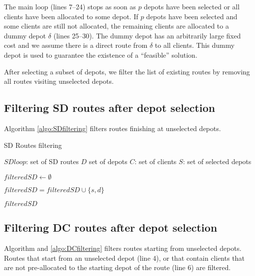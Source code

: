 \documentclass[10pt, a4paper]{article}
\begin{document}
The main loop (lines 7--24) stops as soon as $p$ depots have been selected or all clients have been allocated to some depot. If $p$ depots have been selected and some clients are still not allocated, the remaining clients are allocated to a dummy depot $\delta$ (lines 25--30). The dummy depot has an arbitrarily large fixed cost and we assume there is a direct route from $\delta$ to all clients. This dummy depot is used to guarantee the existence of a ``feasible'' solution.   



\newpage

After selecting a subset of depots, we filter the list of existing routes by removing all routes visiting unselected depots. 

\subsection{Filtering SD routes after depot selection}

Algorithm  \ref{algo:SDfiltering} filters routes finishing at unselected depots. 


\begin{algorithm}
	\caption{SD Routes filtering}
	\label{algo:SDfiltering}
	\begin{algorithmic}[1]
		\REQUIRE $SDloop$: set of SD routes
		\REQUIRE $D$ set of depots
		\REQUIRE $C$: set of clients
		\REQUIRE $S$: set of selected depots
		
		\STATE $filteredSD \leftarrow \emptyset$
		
					\STATE $filteredSD = filteredSD \cup \{s,d\}$
				\ENDIF
		\ENDFOR
		
		\RETURN $filteredSD$
	\end{algorithmic}
\end{algorithm}



\subsection{Filtering DC routes after depot selection}

Algorithm  and \ref{algo:DCfiltering} filters routes starting from unselected depots. 
Routes that start from an unselected depot (line 4), 
or that contain clients that are not pre-allocated to the starting depot of the route (line 6) are filtered. 
\end{document}
